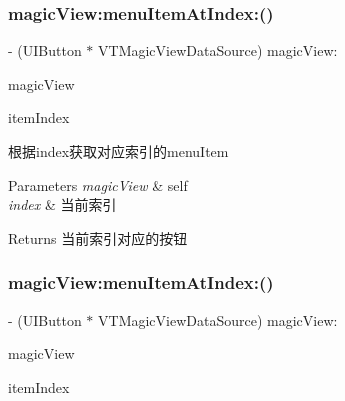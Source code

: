 \subsubsection{\texorpdfstring{magic\+View\+:menu\+Item\+At\+Index\+:()}{magicView:menuItemAtIndex:()}\hspace{0.1cm}{\footnotesize\ttfamily [1/3]}}
{\footnotesize\ttfamily -\/ (U\+I\+Button $\ast$ V\+T\+Magic\+View\+Data\+Source) magic\+View\+: \begin{DoxyParamCaption}\item[{(\mbox{\hyperlink{interface_v_t_magic_view}{V\+T\+Magic\+View}} $\ast$)}]{magic\+View }\item[{menuItemAtIndex:(N\+S\+U\+Integer)}]{item\+Index }\end{DoxyParamCaption}}

根据index获取对应索引的menu\+Item


\begin{DoxyParams}{Parameters}
{\em magic\+View} & self \\
\hline
{\em index} & 当前索引\\
\hline
\end{DoxyParams}
\begin{DoxyReturn}{Returns}
当前索引对应的按钮 
\end{DoxyReturn}
\mbox{\label{protocol_v_t_magic_view_data_source_01-p_ae24594b19e47d8e2803257e6a3d3e09b}} 
\subsubsection{\texorpdfstring{magic\+View\+:menu\+Item\+At\+Index\+:()}{magicView:menuItemAtIndex:()}\hspace{0.1cm}{\footnotesize\ttfamily [2/3]}}
{\footnotesize\ttfamily -\/ (U\+I\+Button $\ast$ V\+T\+Magic\+View\+Data\+Source) magic\+View\+: \begin{DoxyParamCaption}\item[{(\mbox{\hyperlink{interface_v_t_magic_view}{V\+T\+Magic\+View}} $\ast$)}]{magic\+View }\item[{menuItemAtIndex:(N\+S\+U\+Integer)}]{item\+Index }\end{DoxyParamCaption}}

